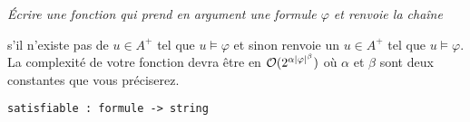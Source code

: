 \begin{Exercise}\it
Écrire une fonction  qui prend en argument une formule $\varphi$ et renvoie la chaîne 
\begin{center}
\end{center}
s'il n'existe pas de $u\in A^+$ tel que $u\vDash\varphi$ et sinon renvoie un $u\in A^+$ tel que $u\vDash\varphi$. La complexité de votre fonction devra être en ${\cal O}(2^{\alpha|\varphi|^\beta})$ où $\alpha$ et $\beta$ sont deux constantes que vous préciserez.

\begin{lstlisting}
satisfiable : formule -> string
\end{lstlisting}
\end{Exercise}
